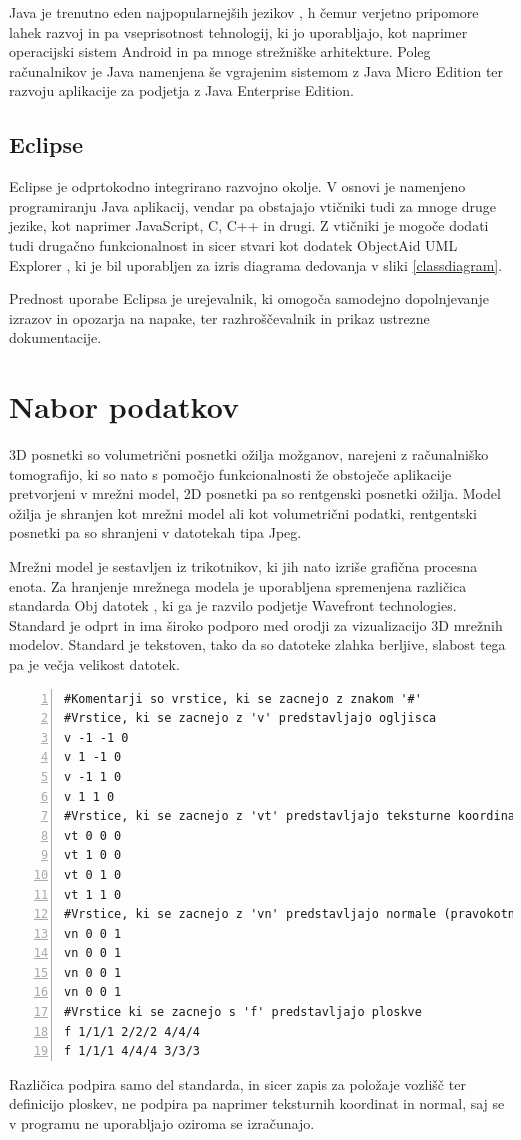 \documentclass[a4paper, 12pt]{book}
\begin{document}
Java je trenutno eden najpopularnejših jezikov \cite{javapopularity}, h čemur verjetno pripomore lahek razvoj in pa vseprisotnost tehnologij, ki jo uporabljajo, kot naprimer operacijski sistem Android in pa mnoge strežniške arhitekture. Poleg računalnikov je Java namenjena še vgrajenim sistemom z Java Micro Edition ter razvoju aplikacije za podjetja z Java Enterprise Edition.

\subsection*{Eclipse}

Eclipse je odprtokodno integrirano razvojno okolje. V osnovi je namenjeno programiranju Java aplikacij, vendar pa obstajajo vtičniki tudi za mnoge druge jezike, kot naprimer JavaScript, C, C++ in drugi. Z vtičniki je mogoče dodati tudi drugačno funkcionalnost in sicer stvari kot dodatek ObjectAid UML Explorer \cite{objectaid}, ki je bil uporabljen za izris diagrama dedovanja v sliki \ref{classdiagram}.

Prednost uporabe Eclipsa je urejevalnik, ki omogoča samodejno dopolnjevanje izrazov in opozarja na napake, ter razhroščevalnik in prikaz ustrezne dokumentacije. 

\section{Nabor podatkov}
3D posnetki so volumetrični posnetki ožilja možganov, narejeni z računalniško tomografijo, ki so nato s pomočjo funkcionalnosti že obstoječe aplikacije pretvorjeni v mrežni model, 2D posnetki pa so rentgenski posnetki ožilja. Model ožilja je shranjen kot mrežni model ali kot volumetrični podatki, rentgentski posnetki pa so shranjeni v datotekah tipa Jpeg\cite{jpeg}.

Mrežni model je sestavljen iz trikotnikov, ki jih nato izriše grafična procesna enota. Za hranjenje mrežnega modela je uporabljena spremenjena različica standarda Obj datotek \cite{obj}, ki ga je razvilo podjetje Wavefront technologies. Standard je odprt in ima široko podporo med orodji za vizualizacijo 3D mrežnih modelov. Standard je tekstoven, tako da so datoteke zlahka berljive, slabost tega pa je večja velikost datotek.
\renewcommand{\lstlistingname}{Datoteka}
\renewcommand{\lstlistlistingname}{Seznam datotek}
{
\footnotesize
\begin{lstlisting}[captionpos=b, frame=single, caption={Primer Obj datoteke, ki predstavlja kvadrat.}, breaklines=true, firstline=1, numbers=left]
#Komentarji so vrstice, ki se zacnejo z znakom '#'
#Vrstice, ki se zacnejo z 'v' predstavljajo ogljisca 
v -1 -1 0
v 1 -1 0
v -1 1 0
v 1 1 0
#Vrstice, ki se zacnejo z 'vt' predstavljajo teksturne koordinate
vt 0 0 0
vt 1 0 0
vt 0 1 0
vt 1 1 0
#Vrstice, ki se zacnejo z 'vn' predstavljajo normale (pravokotnice?)
vn 0 0 1
vn 0 0 1
vn 0 0 1
vn 0 0 1
#Vrstice ki se zacnejo s 'f' predstavljajo ploskve
f 1/1/1 2/2/2 4/4/4
f 1/1/1 4/4/4 3/3/3
\end{lstlisting}}
Različica podpira samo del standarda, in sicer zapis za položaje vozlišč ter definicijo ploskev, ne podpira pa naprimer teksturnih koordinat in normal, saj se v programu ne uporabljajo oziroma se izračunajo.
\end{document}
